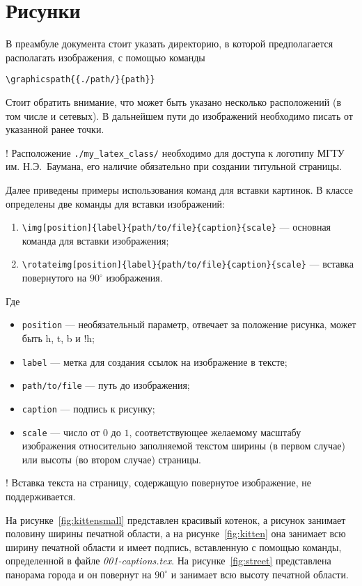 \section{Рисунки}

В преамбуле документа стоит указать директорию, в которой предполагается
располагать изображения, с помощью команды 

\lstinline:\graphicspath{{./path/}{path}}:

Стоит обратить внимание, что может быть указано несколько расположений (в том
числе и сетевых). В дальнейшем пути до изображений необходимо писать от
указанной ранее точки.

! Расположение \lstinline:./my_latex_class/: необходимо для доступа к логотипу
МГТУ им. Н.Э.~Баумана, его наличие обязательно при создании титульной страницы. 

Далее приведены примеры использования команд для вставки картинок. В классе
определены две команды для вставки изображений:
\begin{enumerate}
    \item \lstinline:\img[position]{label}{path/to/file}{caption}{scale}: ---
    основная команда для вставки изображения;
    \item \lstinline:\rotateimg[position]{label}{path/to/file}{caption}{scale}: ---
    вставка повернутого на $90^\circ$ изображения.
\end{enumerate}
Где
\begin{itemize}
    \item \lstinline:position: --- необязательный параметр, отвечает за положение
    рисунка, может быть h, t, b и !h;
    \item \lstinline:label: --- метка для создания ссылок на изображение в тексте;
    \item \lstinline:path/to/file: --- путь до изображения;
    \item \lstinline:caption: --- подпись к рисунку;
    \item \lstinline:scale: --- число от $0$ до $1$, соответствующее желаемому
    масштабу изображения относительно заполняемой текстом ширины (в первом
    случае) или высоты (во втором случае) страницы.
\end{itemize}

! Вставка текста на страницу, содержащую повернутое изображение, не
поддерживается. 

На рисунке~\ref{fig:kittensmall} представлен красивый котенок, а
рисунок занимает половину ширины печатной области, а на рисунке~\ref{fig:kitten}
она занимает всю ширину печатной области и имеет подпись, вставленную с помощью
команды, определенной в файле \textit{001-captions.tex}. На
рисунке~\ref{fig:street} представлена панорама города и он повернут на
$90^\circ$ и занимает всю высоту печатной области. 

